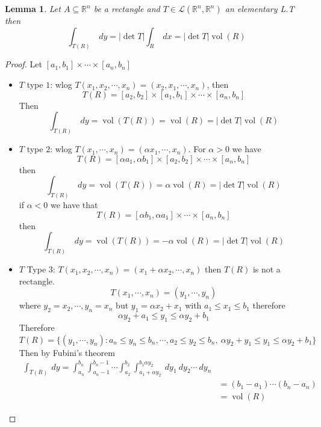 \documentclass[11pt,openany]{book}
\theoremstyle{plain}
\newtheorem{lemma}{Lemma}[chapter]
\theoremstyle{definition}
\theoremstyle{remark}
\newcommand{\R}{\mathbb{R}}
\newcommand{\set}[1]{\{ #1 \}}
\newcommand{\vol}{\operatorname{vol}}
\newcommand{\abs}[1]{\lvert #1 \rvert}
\begin{document}
\begin{lemma}
    Let $A \subseteq \R^n$ be a rectangle and $T \in \mathcal{L}(\R^n, \R^n)$ an elementary L.T then 
    $$\int_{T(R)} \ dy = \abs{\det T } \int_R \ dx = \abs{\det T} \vol (R)$$
\end{lemma}

\begin{proof}
    Let $[a_1, b_1] \times \cdots \times [a_n,b_n]$
    \begin{itemize}
        \item $T$ type $1$: wlog $T(x_1, x_2, \cdots, x_n) = (x_2, x_1, \cdots, x_n)$, then 
        $$T(R) = [a_2, b_2] \times [a_1, b_1] \times \cdots \times [a_n, b_n]$$
        Then
        $$\int_{T(R)} \ dy = \vol (T(R)) = \vol (R) = \abs{\det T} \vol (R)$$

        \item $T$ type $2$: wlog $T(x_1, \cdots, x_n) = (\alpha x_1, \cdots, x_n)$. 
        For $\alpha > 0$ we have 
        $$T(R) = [\alpha a_1, \alpha b_1] \times [a_2, b_2] \times \cdots \times [a_n, b_n]$$
        then 
        $$\int_{T(R)} \ dy = \vol (T(R)) = \alpha \vol (R) = \abs{\det T} \vol (R)$$
        if $\alpha < 0$ we have that 
        $$T(R) = [\alpha b_1, \alpha a_1] \times \cdots \times [a_n, b_n]$$
        then 
        $$\int_{T(R)} \ dy = \vol (T(R)) = - \alpha \vol (R) = \abs{\det T} \vol (R)$$

        \item $T$ Type $3$: $T(x_1, x_2, \cdots, x_n) = (x_1 + \alpha x_2, \cdots, x_n)$ then $T(R)$ is not a rectangle. 
        $$T(x_1, \cdots, x_n) = (y_1, \cdots, y_n)$$
        where $y_2 = x_2, \cdots, y_n = x_n$ but $y_1 = \alpha x_2 + x_1$ with $a_1 \le x_1 \le b_1$ therefore 
        $$\alpha y_2 + a_1 \le y_1 \le \alpha y_2 + b_1$$
        Therefore $T(R) = \set{(y_1, \cdots, y_n) \colon a_n \le y_n \le b_n, \cdots, a_2 \le y_2 \le b_n, \ \alpha y_2 + y_1 \le y_1 \le \alpha y_2 + b_1}$
        Then by Fubini's theorem 
        \begin{align*}
            \int_{T(R)} \ dy = \int_{a_n}^{b_n} \int_{a_n-1}^{b_n-1} \cdots \int_{a_2}^{b_2} \int_{a_1 + \alpha y_2}^{b_1 \alpha y_2} \ d y_1 \ d y_2 \cdots \ dy_n \\
            &= (b_1-a_1) \cdots (b_n - a_n) \\
            &= \vol (R)
        \end{align*} 
    \end{itemize}
\end{proof}
\end{document}
